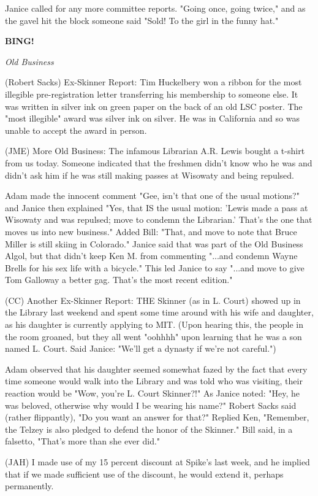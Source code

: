 \documentclass[12pt]{article}
\newcommand{\bing}{{\bf BING!} }
\newcommand{\goto}[1]{\bing \vskip 12pt \centerline{{\em{#1}}}}
\begin{document}
Janice called for any more committee reports. "Going once, going twice," and as the gavel hit the block someone said "Sold! To the girl in the funny hat."

\goto{Old Business}

(Robert Sacks) Ex-Skinner Report: Tim Huckelbery won a ribbon for the most illegible pre-registration letter transferring his membership to someone else. It was written in silver ink on green paper on the back of an old LSC poster. The "most illegible" award was silver ink on silver. He was in California and so was unable to accept the award in person.

(JME) More Old Business: The infamous Librarian A.R. Lewis bought a t-shirt from us today. Someone indicated that the freshmen didn't know who he was and didn't ask him if he was still making passes at Wisowaty and being repulsed.

Adam made the innocent comment "Gee, isn't that one of the usual motions?" and Janice then explained "Yes, that IS the usual motion: 'Lewis made a pass at Wisowaty and was repulsed; move to condemn the Librarian.' That's the one that moves us into new business." Added Bill: "That, and move to note that Bruce Miller is still skiing in Colorado." Janice said that was part of the Old Business Algol, but that didn't keep Ken M. from commenting "...and condemn Wayne Brells for his sex life with a bicycle." This led Janice to say "...and move to give Tom Galloway a better gag. That's the most recent edition."

(CC) Another Ex-Skinner Report: THE Skinner (as in L. Court) showed up in the Library last weekend and spent some time around with his wife and daughter, as his daughter is currently applying to MIT. (Upon hearing this, the people in the room groaned, but they all went "oohhhh" upon learning that he was a son named L. Court. Said Janice: "We'll get a dynasty if we're not careful.")

Adam observed that his daughter seemed somewhat fazed by the fact that every time someone would walk into the Library and was told who was visiting, their reaction would be "Wow, you're L. Court Skinner?!" As Janice noted: "Hey, he was beloved, otherwise why would I be wearing his name?" Robert Sacks said (rather flippantly), "Do you want an answer for that?" Replied Ken, "Remember, the Telzey is also pledged to defend the honor of the Skinner." Bill said, in a falsetto, "That's more than she ever did."

(JAH) I made use of my 15 percent discount at Spike's last week, and he implied that if we made sufficient use of the discount, he would extend it, perhaps permanently.
\end{document}
